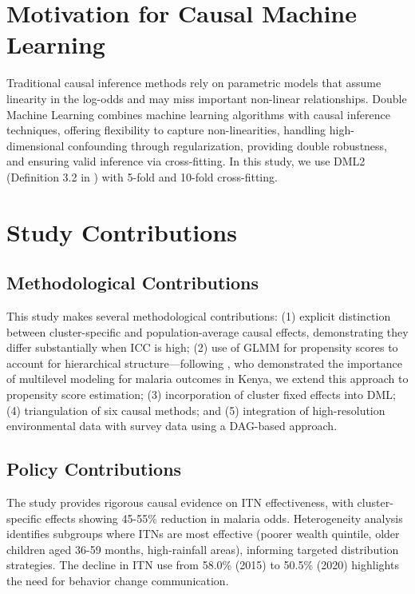 \section{Motivation for Causal Machine Learning}

Traditional causal inference methods rely on parametric models that assume linearity in the log-odds and may miss important non-linear relationships. Double Machine Learning \citep{chernozhukov2018double} combines machine learning algorithms with causal inference techniques, offering flexibility to capture non-linearities, handling high-dimensional confounding through regularization, providing double robustness, and ensuring valid inference via cross-fitting. In this study, we use DML2 (Definition 3.2 in \citealp{chernozhukov2018double}) with 5-fold and 10-fold cross-fitting.

\section{Study Contributions}

\subsection{Methodological Contributions}

This study makes several methodological contributions: (1) explicit distinction between cluster-specific and population-average causal effects, demonstrating they differ substantially when ICC is high; (2) use of GLMM for propensity scores to account for hierarchical structure---following \citet{ayele2024assessment}, who demonstrated the importance of multilevel modeling for malaria outcomes in Kenya, we extend this approach to propensity score estimation; (3) incorporation of cluster fixed effects into DML; (4) triangulation of six causal methods; and (5) integration of high-resolution environmental data with survey data using a DAG-based approach.

\subsection{Policy Contributions}

The study provides rigorous causal evidence on ITN effectiveness, with cluster-specific effects showing 45-55\% reduction in malaria odds. Heterogeneity analysis identifies subgroups where ITNs are most effective (poorer wealth quintile, older children aged 36-59 months, high-rainfall areas), informing targeted distribution strategies. The decline in ITN use from 58.0\% (2015) to 50.5\% (2020) highlights the need for behavior change communication.

